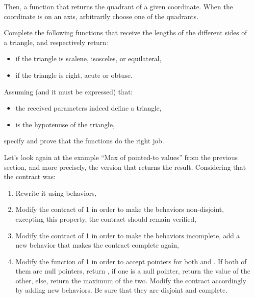 

Then, a function that returns the quadrant of a given coordinate. When
the coordinate is on an axis, arbitrarily choose one of the quadrants.






Complete the following functions that receive the lengths of the different
sides of a triangle, and respectively return:
\begin{itemize}
\item if the triangle is scalene, isosceles, or equilateral,
\item if the triangle is right, acute or obtuse.
\end{itemize}




Assuming (and it must be expressed) that:


\begin{itemize}
\item the received parameters indeed define a triangle,
\item {} is the hypotenuse of the triangle,
\end{itemize}


specify and prove that the functions do the right job.




Let's look again at the example ``Max of pointed-to values'' from the previous section,
and more precisely, the version that returns the result. Considering that
the contract was:






\begin{enumerate}
\item Rewrite it using behaviors,
\item Modify the contract of 1 in order to make the behaviors non-disjoint,
  excepting this property, the contract should remain verified,
\item Modify the contract of 1 in order to make the behaviors incomplete,
  add a new behavior that makes the contract complete again,
\item Modify the function of 1 in order to accept  pointers
  for both  and . If both of them are null pointers,
  return , if one is a null pointer, return the value of
  the other, else, return the maximum of the two. Modify the contract accordingly
  by adding new behaviors. Be sure that they are disjoint and complete.
\end{enumerate}


